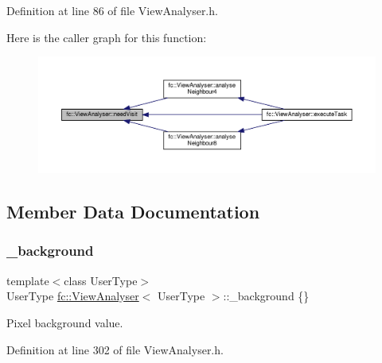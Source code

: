 Definition at line 86 of file View\+Analyser.\+h.

Here is the caller graph for this function\+:
\nopagebreak
\begin{figure}[H]
\begin{center}
\leavevmode
\includegraphics[width=350pt]{df/daf/classfc_1_1ViewAnalyser_a3e64703fb8f40d4bb4953be268f1afb9_icgraph}
\end{center}
\end{figure}


\subsection{Member Data Documentation}
\mbox{\label{classfc_1_1ViewAnalyser_a6dd17c2aa9f8a20889c61bd0edd62b60}} 
\subsubsection{\texorpdfstring{\+\_\+background}{\_background}}
{\footnotesize\ttfamily template$<$class User\+Type$>$ \\
User\+Type \hyperlink{classfc_1_1ViewAnalyser}{fc\+::\+View\+Analyser}$<$ User\+Type $>$\+::\+\_\+background \{\}\hspace{0.3cm}{\ttfamily [private]}}



Pixel background value. 



Definition at line 302 of file View\+Analyser.\+h.

\mbox{\label{classfc_1_1ViewAnalyser_abfab9f8db5a08141b1ae611bfecc3e3c}} 
